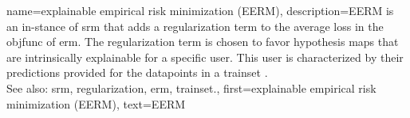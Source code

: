 {name={explainable empirical risk minimization (EERM)}, 
	description={EERM is an 
		in-\linebreak stance of \gls{srm} that adds a \gls{regularization} term to the 
		average \gls{loss} in the \gls{objfunc} of \gls{erm}. 
		The \gls{regularization} term is chosen to favor \gls{hypothesis} \glspl{map} that are intrinsically 
		explainable for a specific user. This user is characterized by their \glspl{prediction} provided 
		for the \glspl{datapoint} in a \gls{trainset} \cite{Zhang:2024aa}.
				\\
		See also: \gls{srm}, \gls{regularization}, \gls{erm}, \gls{trainset}.},
	first={explainable empirical risk minimization (EERM)},
	text={EERM} 
}
	
